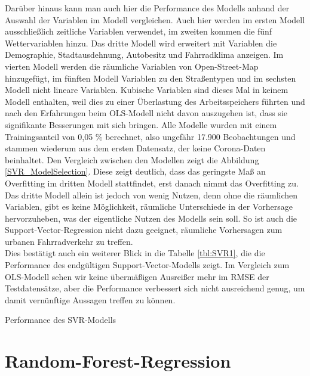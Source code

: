 \documentclass[a4paper,12pt]{thesis}
\begin{document}
Darüber hinaus kann man auch hier die Performance des Modells anhand der Auswahl der Variablen im Modell vergleichen. Auch hier werden im ersten Modell ausschließlich zeitliche Variablen verwendet, im zweiten kommen die fünf Wettervariablen hinzu. Das dritte Modell wird erweitert mit Variablen die Demographie, Stadtausdehnung, Autobesitz und Fahrradklima anzeigen. Im vierten Modell werden die räumliche Variablen von Open-Street-Map hinzugefügt, im fünften Modell Variablen zu den Straßentypen und im sechsten Modell nicht lineare Variablen. Kubische Variablen sind dieses Mal in keinem Modell enthalten, weil dies zu einer Überlastung des Arbeitsspeichers führten und nach den Erfahrungen beim OLS-Modell nicht davon auszugehen ist, dass sie signifikante Besserungen mit sich bringen. Alle Modelle wurden mit einem Trainingsanteil von 0,05 \% berechnet, also ungefähr 17.900 Beobachtungen und stammen wiederum aus dem ersten Datensatz, der keine Corona-Daten beinhaltet. Den Vergleich zwischen den Modellen zeigt die Abbildung \ref{SVR_ModelSelection}. Diese zeigt deutlich, dass das geringste Maß an Overfitting im dritten Modell stattfindet, erst danach nimmt das Overfitting zu. Das dritte Modell allein ist jedoch von wenig Nutzen, denn ohne die räumlichen Variablen, gibt es keine Möglichkeit, räumliche Unterschiede in der Vorhersage hervorzuheben, was der eigentliche Nutzen des Modells sein soll. So ist auch die Support-Vector-Regression nicht dazu geeignet, räumliche Vorhersagen zum urbanen Fahrradverkehr zu treffen.\\
Dies bestätigt auch ein weiterer Blick in die Tabelle \ref{tbl:SVR1}, die die Performance des endgültigen Support-Vector-Modells zeigt. Im Vergleich zum OLS-Modell sehen wir keine übermäßigen Ausreißer mehr im RMSE der Testdatensätze, aber die Performance verbessert sich nicht ausreichend genug, um damit vernünftige Aussagen treffen zu können.

\begin{table}
	\caption{Performance des SVR-Modells}
	\label{tbl:SVR1}
\end{table}

\section{Random-Forest-Regression}\label{RF}
\end{document}

